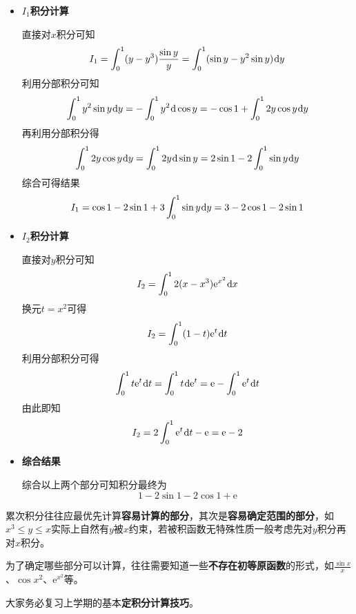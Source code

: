\documentclass[a4paper,UTF8,fontset=windows,AutoFakeBold]{ctexart}
\newcommand*{\dr}{\hspace{0.07em}\mathrm{d}}
\newcommand*{\er}{\mathrm{e}}
\newcommand*{\note}{\noindent *}
\theoremstyle{ex}
\begin{document}
\begin{framed}
{\begin{itemize}
        \item \textbf{$I_1$积分计算}
        
        直接对$x$积分可知
        $$I_1=\int_0^1(y-y^3)\frac{\sin y}{y}=\int_0^1(\sin y-y^2\sin y)\dr y$$
        利用分部积分可知
        $$\int_0^1y^2\sin y\dr y=-\int_0^1y^2\dr\cos y=-\cos 1+\int_0^12y\cos y\dr y$$
        再利用分部积分得
        $$\int_0^12y\cos y\dr y=\int_0^12y\dr\sin y=2\sin 1-2\int_0^1\sin y\dr y$$
        综合可得结果
        $$I_1=\cos 1-2\sin 1+3\int_0^1\sin y\dr y=3-2\cos1-2\sin1$$

        \item \textbf{$I_2$积分计算}
        
        直接对$y$积分可知
        $$I_2=\int_0^12(x-x^3)\er^{x^2}\dr x$$
        换元$t=x^2$可得
        $$I_2=\int_0^1(1-t)\er^t\dr t$$
        利用分部积分可得
        $$\int_0^1t\er^t\dr t=\int_0^1t\dr\er^t=\er-\int_0^1\er^t\dr t$$
        由此即知
        $$I_2=2\int_0^1\er^t\dr t-\er=\er-2$$

        \item \textbf{综合结果}

        综合以上两个部分可知积分最终为
        $$1-2\sin1-2\cos1+\er$$
    \end{itemize}
}
\end{framed}

\note 累次积分往往应最优先计算\textbf{容易计算的部分}，其次是\textbf{容易确定范围的部分}，如$x^3\le y\le x$实际上自然有$y$被$x$约束，若被积函数无特殊性质一般考虑先对$y$积分再对$x$积分。

\note 为了确定哪些部分可以计算，往往需要知道一些\textbf{不存在初等原函数}的形式，如$\frac{\sin x}{x}$、$\cos x^2$、$\er^{x^2}$等。

\note 大家务必复习上学期的基本\textbf{定积分计算技巧}。
\end{document}
